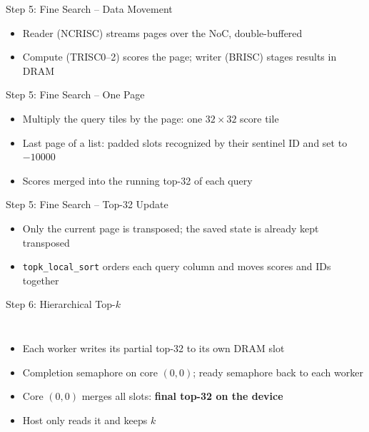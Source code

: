 \begin{frame}{Step 5: Fine Search -- Data Movement}
  \begin{itemize}\footnotesize
    \item Reader (NCRISC) streams pages over the NoC, double-buffered
    \item Compute (TRISC0--2) scores the page; writer (BRISC) stages results in DRAM
  \end{itemize}
\end{frame}

\begin{frame}{Step 5: Fine Search -- One Page}
  \begin{itemize}\footnotesize
    \item Multiply the query tiles by the page: one $32\times32$ score tile
    \item Last page of a list: padded slots recognized by their sentinel ID and set to $-10000$
    \item Scores merged into the running top-32 of each query
  \end{itemize}
\end{frame}

\begin{frame}{Step 5: Fine Search -- Top-32 Update}
  \begin{itemize}\footnotesize
    \item Only the current page is transposed; the saved state is already kept transposed
    \item \texttt{topk\_local\_sort} orders each query column and moves scores and IDs together
  \end{itemize}
\end{frame}

\begin{frame}{Step 6: Hierarchical Top-$k$}
  \begin{columns}
    \begin{itemize}\footnotesize
      \item Each worker writes its partial top-32 to its own DRAM slot
      \item Completion semaphore on core $(0,0)$; ready semaphore back to each worker
      \item Core $(0,0)$ merges all slots: \textbf{final top-32 on the device}
      \item Host only reads it and keeps $k$
    \end{itemize}
  \end{columns}
\end{frame}

